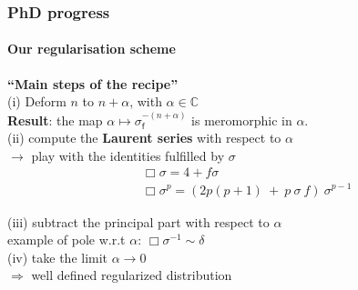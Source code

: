 \documentclass[9pt]{beamer}
\newcommand{\Cbb}{\mathbb{C}}
\newcommand{\fsf}{\mathsf{f}}
\begin{document}
\begin{frame}

\frametitle{PhD progress}
\framesubtitle{Our regularisation scheme}

\textbf{``Main steps of the recipe''} \\[3pt]

(i) Deform $n$ to $n + \alpha$, with $\alpha \in \Cbb$ \\

\qquad \textbf{Result}: the map $\alpha \mapsto \sigma_\fsf^{-(n+\alpha)}$ is meromorphic in $\alpha$. \\[2pt] 
 
(ii) compute the \textbf{Laurent series} with respect to $\alpha$ \\
\qquad $\to$ play with the identities fulfilled by $\sigma$ 
\vspace*{-6pt}
\begin{eqnarray*}
 && \Box \sigma = 4 + f \sigma \\
 && \Box \sigma^p = \left( 2p(p+1) \ + \ p \ \sigma \ f \right) \ \sigma^{p-1}
\end{eqnarray*}

(iii) subtract the principal part with respect to $\alpha$ \\
example of pole w.r.t $\alpha$: $\Box \sigma^{-1} \sim \delta$ \\[2pt]

(iv) take the limit $\alpha \to 0$\\
$\Rightarrow$ well defined regularized distribution

\end{frame} 

\end{document}
